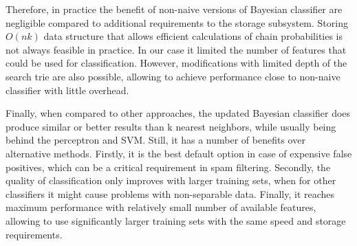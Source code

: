 \documentclass[12pt]{report}
\begin{document}
Therefore, in practice the benefit of non-naive versions of Bayesian classifier are negligible compared to additional requirements to the storage subsystem. Storing $O(nk)$ data structure that allows efficient calculations of chain probabilities is not always feasible in practice. In our case it limited the number of features that could be used for classification. However, modifications with limited depth of the search trie are also possible, allowing to achieve performance close to non-naive classifier with little overhead.

Finally, when compared to other approaches, the updated Bayesian classifier does produce similar or better results than k nearest neighbors, while usually being behind the perceptron and SVM. Still, it has a number of benefits over alternative methods. Firstly, it is the best default option in case of expensive false positives, which can be a critical requirement in spam filtering. Secondly, the quality of classification only improves with larger training sets, when for other classifiers it might cause problems with non-separable data. Finally, it reaches maximum performance with relatively small number of available features, allowing to use significantly larger training sets with the same speed and storage requirements.

\newpage


\end{document}
